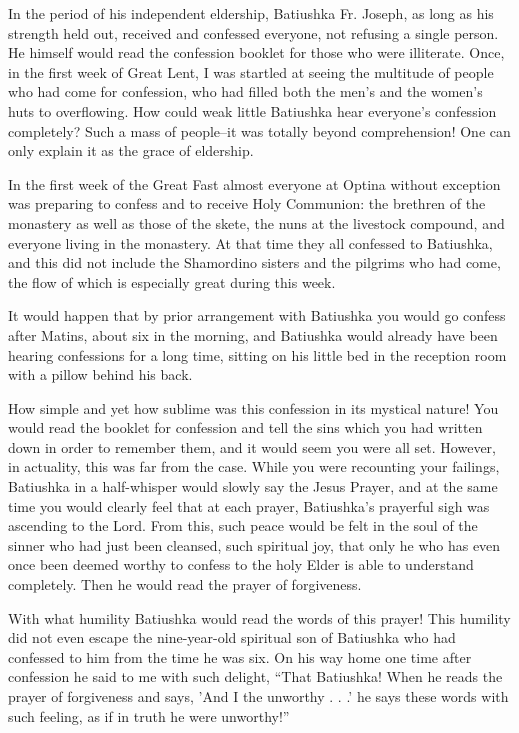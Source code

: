 In the period of his independent eldership, Batiushka Fr. Joseph, as long as his strength held out, received and confessed everyone, not refusing a single person. He himself would read the confession booklet for those who were illiterate. Once, in the first week of Great Lent, I was startled at seeing the multitude of people who had come for confession, who had filled both the men's and the women's huts to overflowing. How could weak little Batiushka hear everyone's confession completely? Such a mass of people--it was totally beyond comprehension! One can only explain it as the grace of eldership.

In the first week of the Great Fast almost everyone at Optina without exception was preparing to confess and to receive Holy Communion: the brethren of the monastery as well as those of the skete, the nuns at the livestock compound, and everyone living in the monastery. At that time they all confessed to Batiushka, and this did not include the Shamordino sisters and the pilgrims who had come, the flow of which is especially great during this week.

It would happen that by prior arrangement with Batiushka you would go confess after Matins, about six in the morning, and Batiushka would already have been hearing confessions for a long time, sitting on his little bed in the reception room with a pillow behind his back.

How simple and yet how sublime was this confession in its mystical nature! You would read the booklet for confession and tell the sins which you had written down in order to remember them, and it would seem you were all set. However, in actuality, this was far from the case. While you were recounting your failings, Batiushka in a half-whisper would slowly say the Jesus Prayer, and at the same time you would clearly feel that at each prayer, Batiushka's prayerful sigh was ascending to the Lord. From this, such peace would be felt in the soul of the sinner who had just been cleansed, such spiritual joy, that only he who has even once been deemed worthy to confess to the holy Elder is able to understand completely. Then he would read the prayer of forgiveness.

With what humility Batiushka would read the words of this prayer! This humility did not even escape the nine-year-old spiritual son of Batiushka who had confessed to him from the time he was six. On his way home one time after confession he said to me with such delight, “That Batiushka! When he reads the prayer of forgiveness and says, 'And I the unworthy . . .' he says these words with such feeling, as if in truth he were unworthy!”

